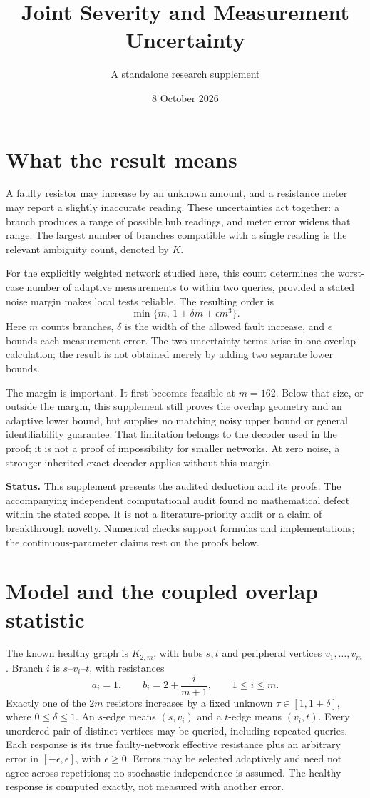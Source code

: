 \documentclass[11pt,letterpaper]{article}
\title{Joint Severity and Measurement Uncertainty}
\author{A standalone research supplement}
\date{8 October 2026}
\begin{document}
\maketitle
\section{What the result means}
A faulty resistor may increase by an unknown amount, and a resistance meter may report a slightly inaccurate reading. These uncertainties act together: a branch produces a range of possible hub readings, and meter error widens that range. The largest number of branches compatible with a single reading is the relevant ambiguity count, denoted by $K$.

For the explicitly weighted network studied here, this count determines the worst-case number of adaptive measurements to within two queries, provided a stated noise margin makes local tests reliable. The resulting order is
\[
 \min\{m,\,1+\delta m+\epsilon m^3\}.
\]
Here $m$ counts branches, $\delta$ is the width of the allowed fault increase, and $\epsilon$ bounds each measurement error. The two uncertainty terms arise in one overlap calculation; the result is not obtained merely by adding two separate lower bounds.

The margin is important. It first becomes feasible at $m=162$. Below that size, or outside the margin, this supplement still proves the overlap geometry and an adaptive lower bound, but supplies no matching noisy upper bound or general identifiability guarantee. That limitation belongs to the decoder used in the proof; it is not a proof of impossibility for smaller networks. At zero noise, a stronger inherited exact decoder applies without this margin.

\noindent\textbf{Status.} This supplement presents the audited deduction and its proofs. The accompanying independent computational audit found no mathematical defect within the stated scope. It is not a literature-priority audit or a claim of breakthrough novelty. Numerical checks support formulas and implementations; the continuous-parameter claims rest on the proofs below.

\section{Model and the coupled overlap statistic}
The known healthy graph is $K_{2,m}$, with hubs $s,t$ and peripheral vertices $v_1,\ldots,v_m$. Branch $i$ is $s$--$v_i$--$t$, with resistances
\[
 a_i=1,\qquad b_i=2+\frac{i}{m+1},\qquad 1\le i\le m.
\]
Exactly one of the $2m$ resistors increases by a fixed unknown $\tau\in[1,1+\delta]$, where $0\le\delta\le1$. An $s$-edge means $(s,v_i)$ and a $t$-edge means $(v_i,t)$. Every unordered pair of distinct vertices may be queried, including repeated queries. Each response is its true faulty-network effective resistance plus an arbitrary error in $[-\epsilon,\epsilon]$, with $\epsilon\ge0$. Errors may be selected adaptively and need not agree across repetitions; no stochastic independence is assumed. The healthy response is computed exactly, not measured with another error.
\end{document}
